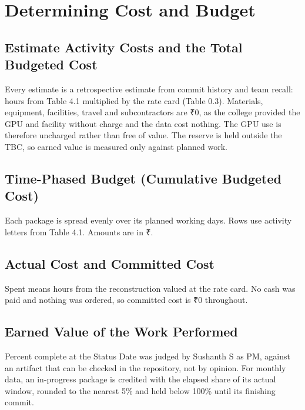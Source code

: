 \section{Determining Cost and Budget}
\subsection{Estimate Activity Costs and the Total Budgeted Cost}
Every estimate is a retrospective estimate from commit history and team recall: hours from Table 4.1 multiplied by the rate card (Table 0.3). Materials, equipment, facilities, travel and subcontractors are ₹0, as the college provided the GPU and facility without charge and the data cost nothing. The GPU use is therefore uncharged rather than free of value. The reserve is held outside the TBC, so earned value is measured only against planned work.



\subsection{Time-Phased Budget (Cumulative Budgeted Cost)}
Each package is spread evenly over its planned working days. Rows use activity letters from Table 4.1. Amounts are in ₹.



\subsection{Actual Cost and Committed Cost}
Spent means hours from the reconstruction valued at the rate card. No cash was paid and nothing was ordered, so committed cost is ₹0 throughout.



\subsection{Earned Value of the Work Performed}
Percent complete at the Status Date was judged by Sushanth S as PM, against an artifact that can be checked in the repository, not by opinion. For monthly data, an in-progress package is credited with the elapsed share of its actual window, rounded to the nearest 5\% and held below 100\% until its finishing commit.



